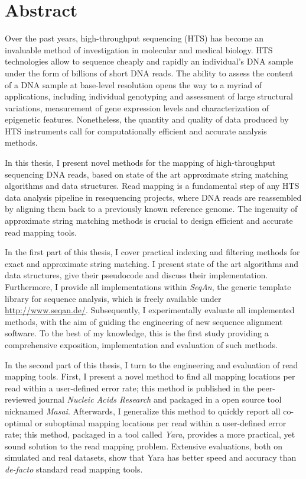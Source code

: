 \section*{Abstract}
\label{sec:abstract:en}

Over the past years, high-throughput sequencing (HTS) has become an invaluable method of investigation in molecular  and medical biology.
HTS technologies allow to sequence cheaply and rapidly an individual's DNA sample under the form of billions of short DNA reads.
The ability to assess the content of a DNA sample at base-level resolution opens the way to a myriad of applications, including individual genotyping and assessment of large structural variations, measurement of gene expression levels and characterization of epigenetic features.
Nonetheless, the quantity and quality of data produced by HTS instruments call for computationally efficient and accurate analysis methods.

In this thesis, I present novel methods for the mapping of high-throughput sequencing DNA reads, based on state of the art approximate string matching algorithms and data structures.
Read mapping is a fundamental step of any HTS data analysis pipeline in resequencing projects, where DNA reads are reassembled by aligning them back to a previously known reference genome.
The ingenuity of approximate string matching methods is crucial to design efficient and accurate read mapping tools.

In the first part of this thesis, I cover practical indexing and filtering methods for exact and approximate string matching.
I present state of the art algorithms and data structures, give their pseudocode and discuss their implementation.
Furthermore, I provide all implementations within \emph{SeqAn}, the generic \CC template library for sequence analysis, which is freely available under \url{http://www.seqan.de/}.
Subsequently, I experimentally evaluate all implemented methods, with the aim of guiding the engineering of new sequence alignment software.
To the best of my knowledge, this is the first study providing a comprehensive exposition, implementation and evaluation of such methods.

In the second part of this thesis, I turn to the engineering and evaluation of read mapping tools.
First, I present a novel method to find all mapping locations per read within a user-defined error rate;
this method is published in the peer-reviewed journal \emph{Nucleic Acids Research} and packaged in a open source tool nicknamed \emph{Masai}.
Afterwards, I generalize this method to quickly report all co-optimal or suboptimal mapping locations per read within a user-defined error rate;
this method, packaged in a tool called \emph{Yara}, provides a more practical, yet sound solution to the read mapping problem.
Extensive evaluations, both on simulated and real datasets, show that Yara has better speed and accuracy than \emph{de-facto} standard read mapping tools.

\newpage
